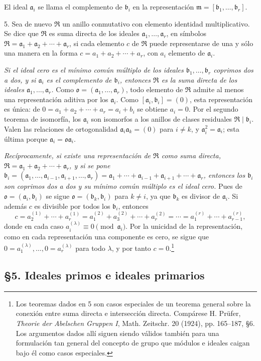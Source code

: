 \documentclass[11pt]{article}
\providecommand{\mR}{\mathfrak{R}}
\providecommand{\ma}{\mathfrak{a}}
\providecommand{\mb}{\mathfrak{b}}
\providecommand{\mm}{\mathfrak{m}}
\providecommand{\mo}{\mathfrak{o}}
\begin{document}
El ideal $\ma_i$ se llama el complemento de $\mb_i$ en la representación $\mm=[\mb_1,\ldots,\mb_r]$.

5. Sea de nuevo $\mR$ un anillo conmutativo con elemento identidad multiplicativo. Se dice que $\mR$ es suma directa de los ideales $\ma_1,\ldots,\ma_r$, en símbolos $\mR=\ma_1+\ma_2+\cdots+\ma_r$, si cada elemento $c$ de $\mR$ puede representarse de una y sólo una manera en la forma $c=a_1+a_2+\cdots+a_r$, con $a_i$ elemento de $\ma_i$.

\emph{Si el ideal cero es el mínimo común múltiplo de los ideales $\mb_1,\ldots,\mb_r$ coprimos dos a dos, y si $\ma_i$ es el complemento de $\mb_i$, entonces $\mR$ es la suma directa de los ideales $\ma_1,\ldots,\ma_r$.} Como $\mo=(\ma_1,\ldots,\ma_r)$, todo elemento de $\mR$ admite al menos una representación aditiva por los $\ma_i$. Como $[\ma_i,\mb_i]=(0)$, esta representación es única: de $0=a_1+a_2+\cdots+a_r=a_i+b_i$ se obtiene $a_i=0$. Por el segundo teorema de isomorfía, los $\ma_i$ son isomorfos a los anillos de clases residuales $\mR\mid\mb_i$. Valen las relaciones de ortogonalidad $\ma_i\ma_k=(0)$ para $i\ne k$, y $\ma_i^2=\ma_i$; esta última porque $\ma_i=\mo\ma_i$.

\emph{Recíprocamente, si existe una representación de $\mR$ como suma directa, $\mR=\ma_1+\ma_2+\cdots+\ma_r$, y si se pone $\mb_i=(\ma_1,\ldots,\ma_{i-1},\ma_{i+1},\ldots,\ma_r)=\ma_1+\cdots+\ma_{i-1}+\ma_{i+1}+\cdots+\ma_r$, entonces los $\mb_i$ son coprimos dos a dos y su mínimo común múltiplo es el ideal cero.} Pues de $\mo=(\ma_i,\mb_i)$ se sigue $\mo=(\mb_k,\mb_i)$ para $k\ne i$, ya que $\mb_k$ es divisor de $\ma_i$. Si además $c$ es divisible por todos los $\mb_i$, entonces
\[
 c=a_2^{(1)}+\cdots+a_r^{(1)}=a_1^{(2)}+a_3^{(2)}+\cdots+a_r^{(2)}=\cdots=a_1^{(r)}+\cdots+a_{r-1}^{(r)},
\]
donde en cada caso $a_i^{(\lambda)}\equiv0\pmod{\ma_i}$. Por la unicidad de la representación, como en cada representación una componente es cero, se sigue que $0=a_1^{(\lambda)},\ldots,0=a_r^{(\lambda)}$ para todo $\lambda$, y por tanto $c=0$.\footnote{Los teoremas dados en 5 son casos especiales de un teorema general sobre la conexión entre suma directa e intersección directa. Compárese H. Prüfer, \emph{Theorie der Abelschen Gruppen I}, Math. Zeitschr. 20 (1924), pp. 165--187, §6. Los argumentos dados allí siguen siendo válidos también para una formulación tan general del concepto de grupo que módulos e ideales caigan bajo él como casos especiales.}

\subsection*{§5. Ideales primos e ideales primarios}
\end{document}
